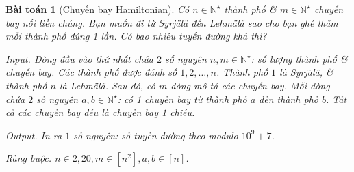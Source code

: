 \documentclass{article}
\newtheorem{baitoan}{Bài toán}
\begin{document}
\begin{baitoan}[Chuyến bay Hamiltonian]
    Có $n\in\mathbb{N}^\star$ thành phố \& $m\in\mathbb{N}^\star$ chuyến bay nối liền chúng. Bạn muốn đi từ Syrjälä đến Lehmälä sao cho bạn ghé thăm mỗi thành phố đúng 1 lần. Có bao nhiêu tuyến đường khả thi?
    \item {\sf Input.} Dòng đầu vào thứ nhất chứa $2$ số nguyên $n,m\in\mathbb{N}^\star$: số lượng thành phố \& chuyến bay. Các thành phố được đánh số $1,2,\ldots,n$. Thành phố $1$ là Syrjälä, \& thành phố $n$ là Lehmälä. Sau đó, có $m$ dòng mô tả các chuyến bay. Mỗi dòng chứa $2$ số nguyên $a,b\in\mathbb{N}^\star$: có 1 chuyến bay từ thành phố $a$ đến thành phố $b$. Tất cả các chuyến bay đều là chuyến bay 1 chiều.
    \item {\sf Output.} In ra $1$ số nguyên: số tuyến đường theo modulo $10^9 + 7$.
    \item {\sf Ràng buộc.} $n\in\overline{2,20},m\in[n^2],a,b\in[n]$.
\end{baitoan}
\end{document}
